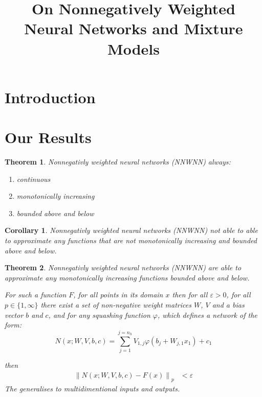 \documentclass{article} %
\title{On Nonnegatively Weighted Neural Networks and Mixture Models}
\newtheorem{thm}{Theorem}
\newtheorem{cor}{Corollary}[thm]
\begin{document}
\maketitle

\begin{abstract}

\end{abstract}


\section{Introduction}

\section{Our Results}

\begin{thm} \label{thm:upper}
	Nonnegativly weighted neural networks (NNWNN) always:
	
	\begin{enumerate}
		\item continuous 
		\item monotonically increasing
		\item bounded above and below
	\end{enumerate}
\end{thm}
\begin{cor}\label{cor:noapproxapproximate}
	Nonnegativly weighted neural networks (NNWNN) not able to able to approximate any functions that are not monotonically increasing and bounded above and below.
\end{cor}

\begin{thm} \label{thm:nnwnnuat}
	Nonnegativly weighted neural networks (NNWNN) are able to approximate any monotonically increasing functions bounded above and below.
	
	
	For such a function $F$,
	for all points in its domain $x$
	then for all $\varepsilon > 0$, for all $p\in \lbrace 1, \infty \rbrace$
	there exist a set of non-negative weight matrices $W$, $V$ and a bias vector $b$ and $c$,
	and for any squashing function $\varphi$,
	which defines a network of the form:
	\begin{equation}
		N(x;W,V,b,c)=\sum_{j=1}^{j=n_{h}}V_{1,j}\varphi(b_{j}+W_{j,1}x_{1})+c_{1}
	\end{equation}
	
	then 
	\begin{align}
	\left\| N(x;W,V,b, c) - F(x) \right\|_p &< \varepsilon
	\end{align}
	The generalises to multidimentional inputs and outputs.
\end{thm}
\end{document}
